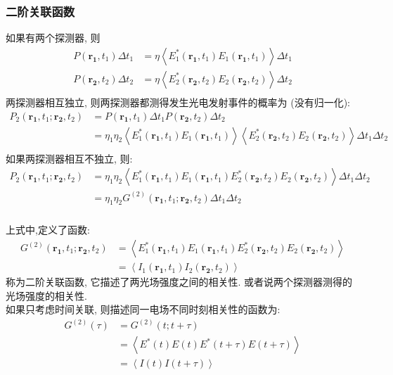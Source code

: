  \begin{frame}   
    \frametitle{二阶关联函数}
   如果有两个探测器, 则
    \[ \begin{aligned}
      P (\mathbf{r_1},t_1) \Delta t_1 &=\eta \left\langle E^*_1 (\mathbf{r_1},t_1) E_1 (\mathbf{r_1},t_1)\right\rangle \Delta t_1  \\
      P (\mathbf{r_2},t_2) \Delta t_2 &=\eta \left\langle E^*_2 (\mathbf{r_2},t_2) E_2 (\mathbf{r_2},t_2)\right\rangle  \Delta t_2  \\
     \end{aligned}\] 
    两探测器相互独立, 则两探测器都测得发生光电发射事件的概率为 (没有归一化):
    \[ \begin{aligned}
        P_2 (\mathbf{r_1},t_1; \mathbf{r_2},t_2)  &= P (\mathbf{r_1},t_1) \Delta t_1 P (\mathbf{r_2},t_2) \Delta t_2\\
        &= \eta_1 \eta_2 \left\langle E^*_1 (\mathbf{r_1},t_1) E_1 (\mathbf{r_1},t_1)\right\rangle  \left\langle E^*_2 (\mathbf{r_2},t_2) E_2 (\mathbf{r_2},t_2)\right\rangle \Delta t_1 \Delta t_2 \\
    \end{aligned}\] 
    如果两探测器相互不独立, 则:
    \[ \begin{aligned}
        P_2 (\mathbf{r_1},t_1; \mathbf{r_2},t_2)  
        &= \eta_1 \eta_2 \left\langle E^*_1 (\mathbf{r_1},t_1) E_1 (\mathbf{r_1},t_1) E^*_2 (\mathbf{r_2},t_2) E_2 (\mathbf{r_2},t_2)\right\rangle \Delta t_1 \Delta t_2 \\
        &= \eta_1 \eta_2  G^{(2)} (\mathbf{r_1},t_1; \mathbf{r_2},t_2) \Delta t_1 \Delta t_2 
    \end{aligned}\]
\end{frame}

\begin{frame} 
 \frametitle{}
 上式中,定义了函数:
 \[ \boxed{ \begin{aligned}   
 G^{(2)} (\mathbf{r_1},t_1; \mathbf{r_2},t_2)  &= \left\langle E^*_1 (\mathbf{r_1},t_1) E_1 (\mathbf{r_1},t_1) E^*_2 (\mathbf{r_2},t_2) E_{2} (\mathbf{r_2},t_2)\right\rangle \\ 
 &= \left\langle I_1 (\mathbf{r_1},t_1) I_2 (\mathbf{r_2},t_2)\right\rangle
\end{aligned}} \]
称为二阶关联函数, 它描述了两光场强度之间的相关性. 或者说两个探测器测得的光场强度的相关性. \\ 
如果只考虑时间关联, 则描述同一电场不同时刻相关性的函数为:
\[ \begin{aligned}
    G^{(2)}(\tau) &= G^{(2)}(t; t+ \tau) \\
    &= \left\langle E^* (t) E (t) E^* (t+ \tau) E (t+ \tau)\right\rangle \\
    &= \left\langle I (t)  I (t+ \tau)\right\rangle \\ 
\end{aligned}\] 
\end{frame}

